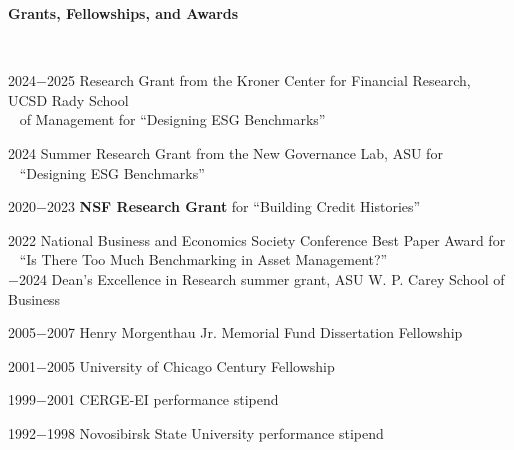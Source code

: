 \documentclass[11pt]{article}
\begin{document}
\medskip

\textbf{Grants, Fellowships, and Awards}

\ \



2024$-$2025  \hspace{.1in} Research Grant from the Kroner Center for Financial Research, UCSD Rady School\\ \smallskip \ \hspace{.8in} of Management for ``Designing ESG Benchmarks'' 
\smallskip

2024   \hspace{.5in} Summer Research Grant from the New Governance Lab, ASU for \\ \smallskip \ \hspace{.8in}   ``Designing ESG Benchmarks'' 
\smallskip

2020$-$2023  \hspace{.1in} {\bf NSF Research Grant} for ``Building Credit Histories'' 

\medskip

2022 \hspace{.5in} National Business and Economics Society Conference Best Paper Award for \\
\smallskip  \ \hspace{.8in}  ``Is There Too Much Benchmarking in Asset Management?''\\
$-$2024 \hspace{.1in}  Dean's Excellence in Research summer grant, ASU W. P. Carey  School of Business

\medskip

2005$-$2007 \hspace{.1in}  Henry Morgenthau Jr. Memorial Fund Dissertation Fellowship 

\medskip

2001$-$2005 \hspace{.1in}  University of Chicago Century Fellowship 

\medskip

 1999$-$2001 \hspace{.1in}  CERGE-EI performance stipend

\medskip

1992$-$1998 \hspace{.1in}  Novosibirsk State University performance stipend

\ \
 
\end{document}

